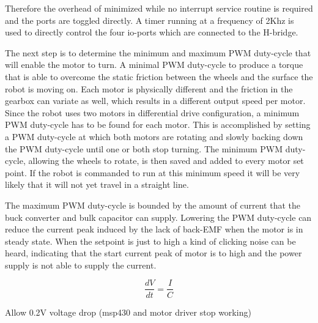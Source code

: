Therefore the overhead of minimized while no interrupt service routine is required and the ports are toggled directly.
A timer running at a frequency of 2Khz is used to directly control the four io-ports which are connected to the H-bridge.



The next step is to determine the minimum and maximum PWM duty-cycle that will enable the motor to turn.
A minimal PWM duty-cycle to produce a torque that is able to overcome the static friction between the wheels and the surface the robot is moving on.
Each motor is physically different and the friction in the gearbox can variate as well, which results in a different output speed per motor.
Since the robot uses two motors in differential drive configuration, a minimum PWM duty-cycle has to be found for each motor.
This is accomplished by setting a PWM duty-cycle at which both motors are rotating and slowly backing down the PWM duty-cycle until one or both stop turning.
The minimum PWM duty-cycle, allowing the wheels to rotate, is then saved and added to every motor set point.
If the robot is commanded to run at this minimum speed it will be very likely that it will not yet travel in a straight line.


The maximum PWM duty-cycle is bounded by the amount of current that the buck converter and bulk capacitor can supply.
Lowering the PWM duty-cycle can reduce the current peak induced by the lack of back-EMF when the motor is in steady state.
When the setpoint is just to high a kind of clicking noise can be heard, indicating that the start current peak of motor is to high and the power supply is not able to supply the current.


\begin{equation}
\frac{dV}{dt} = \frac{I}{C}
\end{equation}

Allow 0.2V voltage drop (msp430 and motor driver stop working)


